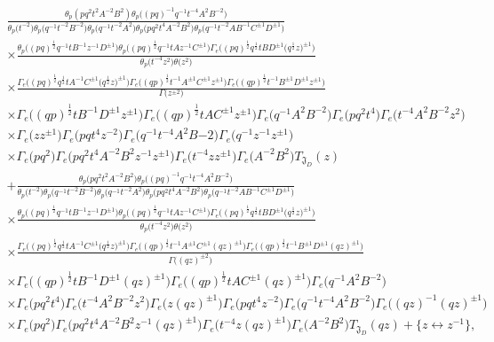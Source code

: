 \documentclass[a4paper,12pt]{article}
\begin{document}
\begin{gather*}
\frac{\theta_p(pq^2t^2A^{-2}B^2)\theta_p\big((pq)^{-1}q^{-1}t^{-4}A^2B^{-2}\big)}
{\theta_p\big(t^{-2}\big)\theta_p\big(q^{-1}t^{-2}B^{-2}\big)\theta_p\big(q^{-1}t^{-2}A^2\big)\theta_p\big(pq^2t^4A^{-2}B^2\big)
\theta_p\big(q^{-1}t^{-2}AB^{-1}C^{\pm1}D^{\pm1}\big)}\\
\times\frac{\theta_p\big((pq)^\frac{1}{2}q^{-1}tB^{-1}z^{-1}D^{\pm1}\big)
\theta_p\big((pq)^\frac{1}{2}q^{-1}tAz^{-1}C^{\pm1}\big)
\Gamma_e\big((pq)^\frac{1}{2}q^\frac{1}{2}t B D^{\pm1}\big(q^\frac{1}{2}z\big)^{\pm1}\big)}
{\theta_p\big(t^{-4}z^2\big)\theta\big(z^2\big)}\\
\times \frac{\Gamma_e\big((pq)^{\frac{1}{2}}q^\frac{1}{2}tA^{-1}C^{\pm1}\big(q^\frac{1}{2}z\big)^{\pm1}\big)\Gamma_e\big((q p)^{\frac12 }t^{-1} A^{\pm1} C^{\pm1}z^{\pm1}\big)
\Gamma_e\big((q p)^{\frac12 }t^{-1} B^{\pm1} D^{\pm1}z^{\pm1}\big)}{\Gamma\big(z^{\pm2}\big)}\\
\times\Gamma_e\big((qp)^{\frac12}t B^{-1}D^{\pm1} z^{\pm1}\big)
\Gamma_e\big((q p)^{\frac12}t A C^{\pm1} z^{\pm1}\big)
\Gamma_e\big(q^{-1}A^2B^{-2}\big)\Gamma_e\big(pq^2t^4\big)\Gamma_e\big(t^{-4}A^2B^{-2}z^2\big)\\
\times\Gamma_e\big(zz^{\pm1}\big)\Gamma_e\big(pqt^4z^{-2}\big)\Gamma_e\big(q^{-1}t^{-4}A^2B{-2}\big)\Gamma_e\big(q^{-1}z^{-1}z^{\pm1}\big)\\
\times\Gamma_e\big(pq^2\big)\Gamma_e\big(pq^2t^4A^{-2}B^2z^{-1}z^{\pm1}\big)\Gamma_e\big(t^{-4}zz^{\pm1}\big)
\Gamma_e\big(A^{-2}B^2\big)T_{{\mathfrak J}_D}(z)\\
+ \frac{\theta_p\big(pq^2t^2A^{-2}B^2\big)\theta_p\big((pq)^{-1}q^{-1}t^{-4}A^2B^{-2}\big)}
{\theta_p\big(t^{-2}\big)\theta_p\big(q^{-1}t^{-2}B^{-2}\big)\theta_p\big(q^{-1}t^{-2}A^2\big)\theta_p\big(pq^2t^4A^{-2}B^2\big)
\theta_p\big(q^{-1}t^{-2}AB^{-1}C^{\pm1}D^{\pm1}\big)}\\
\times\frac{\theta_p\big((pq)^\frac{1}{2}q^{-1}tB^{-1}z^{-1}D^{\pm1}\big)
\theta_p\big((pq)^\frac{1}{2}q^{-1}tAz^{-1}C^{\pm1}\big)
\Gamma_e\big((pq)^\frac{1}{2}q^\frac{1}{2}t B D^{\pm1}\big(q^\frac{1}{2}z\big)^{\pm1}\big)}
{\theta_p\big(t^{-4}z^2\big)\theta\big(z^2\big)}\\
\times\frac{\Gamma_e\big((pq)^{\frac{1}{2}}q^\frac{1}{2}tA^{-1}C^{\pm1}\big(q^\frac{1}{2}z\big)^{\pm1}\big)\Gamma_e\big((q p)^{\frac12 }t^{-1} A^{\pm1} C^{\pm1}(qz)^{\pm1}\big)\Gamma_e\big((q p)^{\frac12 }t^{-1} B^{\pm1} D^{\pm1}(qz)^{\pm1}\big)}{\Gamma\big((qz)^{\pm2}\big)}\\
\times\Gamma_e\big((qp)^{\frac12}t B^{-1}D^{\pm1} (qz)^{\pm1}\big)
\Gamma_e\big((q p)^{\frac12}t A C^{\pm1} (qz)^{\pm1}\big)\Gamma_e\big(q^{-1}A^2B^{-2}\big)\\
\times\Gamma_e\big(pq^2t^4\big)\Gamma_e\big(t^{-4}A^2B^{-2}z^2\big)\Gamma_e\big(z(qz)^{\pm1}\big)
\Gamma_e\big(pqt^4z^{-2}\big)\Gamma_e\big(q^{-1}t^{-4}A^2B^{-2}\big)\Gamma_e\big((qz)^{-1}(qz)^{\pm1}\big)\\
\times\Gamma_e\big(pq^2\big)\Gamma_e\big(pq^2t^4A^{-2}B^2z^{-1}(qz)^{\pm1}\big)\Gamma_e\big(t^{-4}z(qz)^{\pm1}\big)
\Gamma_e\big(A^{-2}B^2\big)T_{{\mathfrak J}_D}(qz) + \big\{z\leftrightarrow z^{-1}\big\},
\end{gather*}
\end{document}
